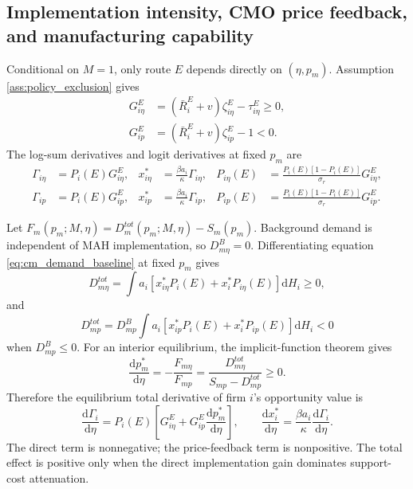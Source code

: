 \documentclass[12pt]{article}
\newcommand{\1}{\mathbf{1}}
\newcommand{\dd}{\mathrm{d}}
\begin{document}
\subsection{Implementation intensity, CMO price feedback, and manufacturing capability}

Conditional on $M=1$, only route $E$ depends directly on $(\eta,p_m)$. Assumption \ref{ass:policy_exclusion} gives
\begin{align}
    G_{i\eta}^E
    &=(\bar R_i^E+v)\zeta_{i\eta}^E-\tau_{i\eta}^E\ge0,
    \label{eq:GE_eta_appendix}\\
    G_{ip}^E
    &=(\bar R_i^E+v)\zeta_{ip}^E-1<0.
    \label{eq:GE_p_appendix}
\end{align}
The log-sum derivatives and logit derivatives at fixed $p_m$ are
\begin{align}
    \Gamma_{i\eta}&=P_i(E)G_{i\eta}^E,
    &x_{i\eta}^*&=\frac{\beta a_i}{\kappa}\Gamma_{i\eta},
    &P_{i\eta}(E)&=\frac{P_i(E)[1-P_i(E)]}{\sigma_r}G_{i\eta}^E,
    \label{eq:eta_partial_derivatives}\\
    \Gamma_{ip}&=P_i(E)G_{ip}^E,
    &x_{ip}^*&=\frac{\beta a_i}{\kappa}\Gamma_{ip},
    &P_{ip}(E)&=\frac{P_i(E)[1-P_i(E)]}{\sigma_r}G_{ip}^E.
    \label{eq:p_partial_derivatives}
\end{align}

Let $F_m(p_m;M,\eta)=D_m^{tot}(p_m;M,\eta)-S_m(p_m)$. Background demand is independent of MAH implementation, so $D_{m\eta}^B=0$. Differentiating equation \eqref{eq:cm_demand_baseline} at fixed $p_m$ gives
\begin{equation}
    D_{m\eta}^{tot}
    =\int a_i\left[x_{i\eta}^*P_i(E)+x_i^*P_{i\eta}(E)\right]\dd H_i\ge0,
    \label{eq:D_eta_expanded}
\end{equation}
and
\begin{equation}
    D_{mp}^{tot}
    =D_{mp}^B
     \int a_i\left[x_{ip}^*P_i(E)+x_i^*P_{ip}(E)\right]\dd H_i<0
    \label{eq:D_p_expanded}
\end{equation}
when $D_{mp}^B\le0$. For an interior equilibrium, the implicit-function theorem gives
\begin{equation}
    \frac{\dd p_m^*}{\dd\eta}
    =-\frac{F_{m\eta}}{F_{mp}}
    =\frac{D_{m\eta}^{tot}}{S_{mp}-D_{mp}^{tot}}\ge0.
    \label{eq:dpdeta_appendix}
\end{equation}
Therefore the equilibrium total derivative of firm $i$'s opportunity value is
\begin{equation}
    \frac{\dd\Gamma_i}{\dd\eta}
    =P_i(E)\left[
      G_{i\eta}^E+G_{ip}^E\frac{\dd p_m^*}{\dd\eta}
    \right],
    \qquad
    \frac{\dd x_i^*}{\dd\eta}
    =\frac{\beta a_i}{\kappa}\frac{\dd\Gamma_i}{\dd\eta}.
    \label{eq:dGammadeta_appendix}
\end{equation}
The direct term is nonnegative; the price-feedback term is nonpositive. The total effect is positive only when the direct implementation gain dominates support-cost attenuation.
\end{document}
